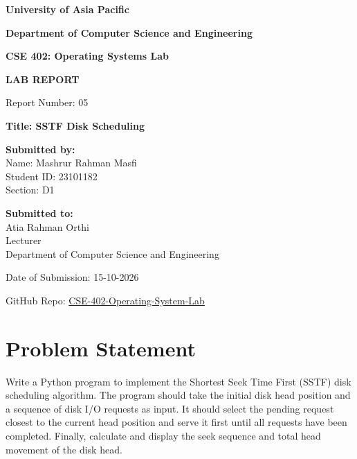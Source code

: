 \documentclass[12pt,a4paper]{article}
\begin{document}
\begin{titlepage}
    \centering
    \vspace*{1cm}
    {\Huge \bfseries University of Asia Pacific \par}
    \vspace{0.5cm}
    {\Large \bfseries Department of Computer Science and Engineering \par}
    \vspace{1.5cm}
    {\huge \bfseries CSE 402: Operating Systems Lab \par}
    \vspace{1cm}
    {\LARGE \bfseries LAB REPORT \par}
    \vspace{0.5cm}
    {\Large Report Number: 05 \par}
    \vspace{1cm}
    {\Large \bfseries Title: SSTF Disk Scheduling \par}
    \vspace{2cm}
    
    \begin{flushleft}
        \large \textbf{Submitted by:} \\
        Name: Mashrur Rahman Masfi \\
        Student ID: 23101182 \\
        Section: D1
    \end{flushleft}
    \vspace{1.5cm}
    
    \begin{flushleft}
        \large \textbf{Submitted to:} \\
        Atia Rahman Orthi \\
        Lecturer \\
        Department of Computer Science and Engineering
    \end{flushleft}
    \vspace{1.5cm}
    
    {\large Date of Submission: 15-10-2026 \par}
    \vfill
    {\large GitHub Repo: \href{https://github.com/MasfiRahman/CSE-402-Operating-System-Lab-.git}{CSE-402-Operating-System-Lab} \par}
\end{titlepage}


\section{Problem Statement}
Write a Python program to implement the Shortest Seek Time First (SSTF) disk scheduling algorithm. The program should take the initial disk head position and a sequence of disk I/O requests as input. It should select the pending request closest to the current head position and serve it first until all requests have been completed. Finally, calculate and display the seek sequence and total head movement of the disk head.
\end{document}
